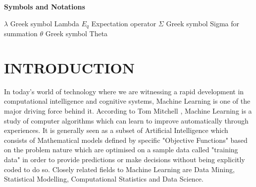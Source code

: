 \documentclass[12pt,a4paper]{article}
\begin{document}
  
  
\newpage
\begin{center}
  \Large\textbf{Symbols and Notations} 
  \end{center}
  \large{$\lambda$} \indent\indent\indent\indent\indent\indent\indent\indent\indent\indent\indent\indent\large{Greek symbol Lambda}\newline
  \large{$E_q$} \indent\indent\indent\indent\indent\indent\indent\indent\indent\indent\indent\indent\large{Expectation operator}\newline
  \large{$\Sigma$} \indent\indent\indent\indent\indent\indent\indent\indent\indent\indent\indent\indent\large{Greek symbol Sigma for summation}\newline
  \large{$\theta$} \indent\indent\indent\indent\indent\indent\indent\indent\indent\indent\indent\indent\large{Greek symbol Theta}\newline
  

\newpage
\section{\uppercase{Introduction}}
\label{sec:intro}
In today's world of technology where we are witnessing a rapid development in computational intelligence and cognitive systems, Machine Learning is one of the major driving force behind it. According to Tom Mitchell \cite{Tom:1997}, Machine Learning is a study of computer algorithms which can learn to improve automatically through experiences. It is generally seen as a subset of Artificial Intelligence which consists of Mathematical models defined by specific "Objective Functions" based on the problem nature which are optimised on a sample data called "training data" in order to provide predictions or make decisions without being explicitly coded to do so. Closely related fields to Machine Learning are Data Mining, Statistical Modelling, Computational Statistics and Data Science.
\vspace{2mm}
\end{document}
